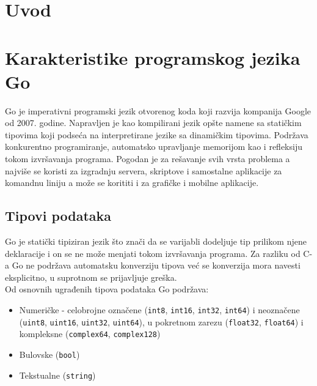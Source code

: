 \documentclass[12pt,oneside]{memoir}
\begin{document}
\frontmatter
\naslovna
\komisija
{}
\apstrakt
\tableofcontents*


\mainmatter


\chapter{Uvod}




\chapter{Karakteristike programskog jezika Go}

Go je imperativni programski jezik otvorenog koda koji razvija kompanija Google od 2007. godine. Napravljen je kao kompilirani jezik opšte namene sa statičkim tipovima koji podseća na interpretirane jezike sa dinamičkim tipovima. Podržava konkurentno programiranje, automatsko upravljanje memorijom kao i refleksiju tokom izvršavanja programa. Pogodan je za rešavanje svih vrsta problema a najviše se koristi za izgradnju servera, skriptove i samostalne aplikacije za komandnu liniju a može se korititi i za grafičke i mobilne aplikacije.

\section{Tipovi podataka}

Go je statički tipiziran jezik što znači da se varijabli dodeljuje tip prilikom njene deklaracije i on se ne može menjati tokom izvršavanja programa.  Za razliku od C-a Go ne podržava automatsku konverziju tipova već se konverzija mora navesti eksplicitno, u suprotnom se prijavljuje greška.\\

Od osnovnih ugrađenih tipova podataka Go podržava:
\begin{itemize}

\item Numeričke -  celobrojne označene (\texttt{int8}, \texttt{int16}, \texttt{int32}, \texttt{int64})
 i neoznačene  (\texttt{uint8}, \texttt{uint16}, \texttt{uint32}, \texttt{uint64}), u pokretnom zarezu (\texttt{float32}, \texttt{float64}) i kompleksne (\texttt{complex64}, \texttt{complex128})

\item Bulovske  (\texttt{bool})

\item Tekstualne (\texttt{string})

\end{itemize}
\end{document}

